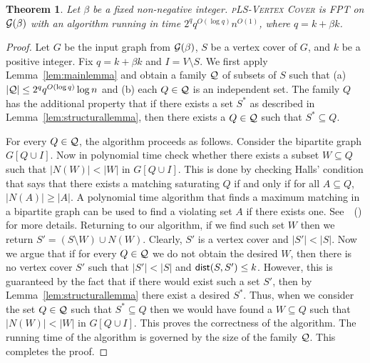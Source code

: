 \documentclass[10pt,usletter]{article}
\newcommand{\dist}{{\normalfont \textsf{dist}}}
\newcommand{\PLSVC}{\textsc{pLS-Vertex Cover}\xspace}
\newcommand{\citex}[1]{\citeauthor{#1}~(\citeyear{#1})}
\newtheorem{theorem}{Theorem}
\begin{document}
\begin{theorem}
\label{thm:fptplsvc}
Let $\beta$ be a fixed non-negative integer. 
\PLSVC  is FPT on ${\cal G}(\beta)$ with an algorithm running in time $2^q q^{O(\log q)}n^{O(1)}$, where $q=k+\beta k$. 
\end{theorem}
\begin{proof}
Let $G$ be the input graph from ${\cal G}(\beta)$, $S$ be a vertex cover of $G$, and $k$ be a positive integer. 
Fix $q=k+\beta k$ and $I=V\setminus S$. We first apply Lemma~\ref{lem:mainlemma} and obtain a family ${\cal Q}$ of 
subsets of $S$ such that (a) $|{\cal Q}|\leq 2^q q^{O(\log q)} \log n$ and (b) each $Q\in {\cal Q}$ is an independent set. The family $Q$ has the additional 
property that if there exists a set $S^*$ as described in Lemma~\ref{lem:structurallemma}, then 
there exists a $Q\in \cal Q$ such that $S^* \subseteq Q $. 

For every $Q\in \cal Q$, the algorithm proceeds as follows. Consider the bipartite graph $G[Q\cup I]$. Now in polynomial time
check whether there exists a subset $W\subseteq Q$ such that $|N(W)|<|W|$ in $G[Q\cup I]$. This is done by checking
Halls' condition that says that  there exists a matching saturating $Q$ if and only if for all $A\subseteq Q$, $|N(A)|\geq |A|$. 
A polynomial time algorithm that finds a maximum matching in a bipartite graph can be used to find a violating set $A$ if there exists one. 
See~\citex{Kozen91} for more details.  Returning to our algorithm, if we find such set 
$W$ then we return $S'=(S\setminus W) \cup N(W)$. Clearly, $S'$ is a vertex cover and $|S'|<|S|$. 
Now we argue that if for every $Q\in \cal Q$ we do not obtain the desired $W$, then 
there is no vertex cover  $S'$ such that $|S'|<|S|$ and $\dist(S,S')\leq k$. However, this is guaranteed by the fact that 
if there would exist such a set $S'$, then by Lemma~\ref{lem:structurallemma} there exist a desired $S^*$. Thus, when we consider 
the set $Q\in \cal Q$ such that $S^*\subseteq Q$ then we would have found a $W\subseteq Q$ such that $|N(W)|<|W|$ in $G[Q\cup I]$. 
This proves the correctness of the algorithm. The running time of the algorithm is governed by the size of the family $\cal Q$.  
This completes the proof.
\end{proof}
\end{document}
